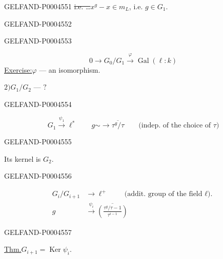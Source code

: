 \begin{GelfandAdjacentEvidence}{GELFAND-P000455}{1}
\sout{i.e. \ldots}\qquad $x^g-x\in m_L$, i.e. $g\in G_1$.
\end{GelfandAdjacentEvidence}
\begin{GelfandAdjacentEvidence}{GELFAND-P000455}{2}

\end{GelfandAdjacentEvidence}
\begin{GelfandAdjacentEvidence}{GELFAND-P000455}{3}


\[
0\longrightarrow G_0/G_1\xrightarrow{\varphi}\operatorname{Gal}(\ell:k)
\]
\underline{Exercise:}\quad $\varphi$ — an isomorphism.

$2)$\quad $G_1/G_2$ — $?$
\end{GelfandAdjacentEvidence}
\begin{GelfandAdjacentEvidence}{GELFAND-P000455}{4}


\[
G_1\xrightarrow{\psi_1}\ell^*
\qquad
g\mathrel{\sim\!\longrightarrow}\overline{\tau^g/\tau}
\qquad\text{(indep. of the choice of $\tau$)}
\]
\end{GelfandAdjacentEvidence}
\begin{GelfandAdjacentEvidence}{GELFAND-P000455}{5}


Its kernel is $G_2$.
\end{GelfandAdjacentEvidence}
\begin{GelfandAdjacentEvidence}{GELFAND-P000455}{6}


\[
\begin{aligned}
G_i/G_{i+1}&\longrightarrow\ell^+
   \qquad\text{(addit. group of the field $\ell$).}\\
g&\xrightarrow{\psi_i}
\overline{\left(\frac{\tau^g/\tau-1}{\tau^{i-1}}\right)}
\end{aligned}
\]
\end{GelfandAdjacentEvidence}
\begin{GelfandAdjacentEvidence}{GELFAND-P000455}{7}

\underline{Thm.}\quad $G_{i+1}=\operatorname{Ker}\psi_i$.
\end{GelfandAdjacentEvidence}
